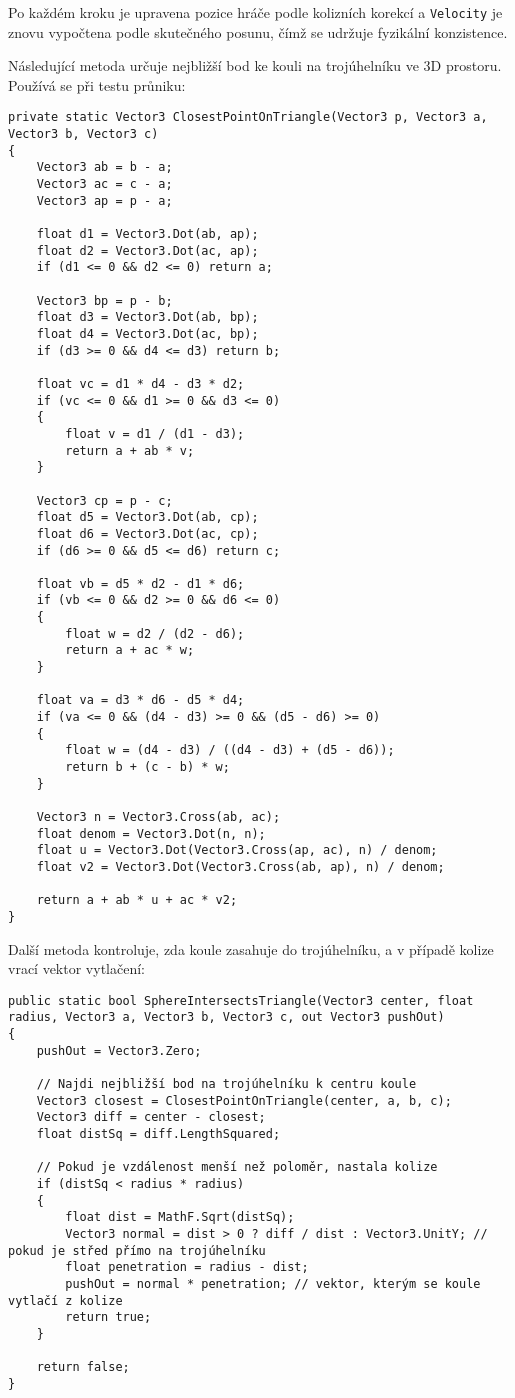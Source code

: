 \documentclass[12pt,a4paper]{article}
\begin{document}
Po každém kroku je upravena pozice hráče podle kolizních korekcí a \texttt{Velocity} je znovu vypočtena podle skutečného posunu, čímž se udržuje fyzikální konzistence.

\newpage
Následující metoda určuje nejbližší bod ke kouli na trojúhelníku ve 3D prostoru. Používá se při testu průniku:

\begin{lstlisting}
private static Vector3 ClosestPointOnTriangle(Vector3 p, Vector3 a, Vector3 b, Vector3 c)
{
    Vector3 ab = b - a;
    Vector3 ac = c - a;
    Vector3 ap = p - a;

    float d1 = Vector3.Dot(ab, ap);
    float d2 = Vector3.Dot(ac, ap);
    if (d1 <= 0 && d2 <= 0) return a;

    Vector3 bp = p - b;
    float d3 = Vector3.Dot(ab, bp);
    float d4 = Vector3.Dot(ac, bp);
    if (d3 >= 0 && d4 <= d3) return b;

    float vc = d1 * d4 - d3 * d2;
    if (vc <= 0 && d1 >= 0 && d3 <= 0)
    {
        float v = d1 / (d1 - d3);
        return a + ab * v;
    }

    Vector3 cp = p - c;
    float d5 = Vector3.Dot(ab, cp);
    float d6 = Vector3.Dot(ac, cp);
    if (d6 >= 0 && d5 <= d6) return c;

    float vb = d5 * d2 - d1 * d6;
    if (vb <= 0 && d2 >= 0 && d6 <= 0)
    {
        float w = d2 / (d2 - d6);
        return a + ac * w;
    }

    float va = d3 * d6 - d5 * d4;
    if (va <= 0 && (d4 - d3) >= 0 && (d5 - d6) >= 0)
    {
        float w = (d4 - d3) / ((d4 - d3) + (d5 - d6));
        return b + (c - b) * w;
    }

    Vector3 n = Vector3.Cross(ab, ac);
    float denom = Vector3.Dot(n, n);
    float u = Vector3.Dot(Vector3.Cross(ap, ac), n) / denom;
    float v2 = Vector3.Dot(Vector3.Cross(ab, ap), n) / denom;

    return a + ab * u + ac * v2;
}
\end{lstlisting}

\newpage
\noindent
Další metoda kontroluje, zda koule zasahuje do trojúhelníku, a v případě kolize vrací vektor vytlačení:

\begin{lstlisting}
public static bool SphereIntersectsTriangle(Vector3 center, float radius, Vector3 a, Vector3 b, Vector3 c, out Vector3 pushOut)
{
    pushOut = Vector3.Zero;

    // Najdi nejbližší bod na trojúhelníku k centru koule
    Vector3 closest = ClosestPointOnTriangle(center, a, b, c);
    Vector3 diff = center - closest;
    float distSq = diff.LengthSquared;

    // Pokud je vzdálenost menší než poloměr, nastala kolize
    if (distSq < radius * radius)
    {
        float dist = MathF.Sqrt(distSq);
        Vector3 normal = dist > 0 ? diff / dist : Vector3.UnitY; // pokud je střed přímo na trojúhelníku
        float penetration = radius - dist;
        pushOut = normal * penetration; // vektor, kterým se koule vytlačí z kolize
        return true;
    }

    return false;
}
\end{lstlisting}
\end{document}
